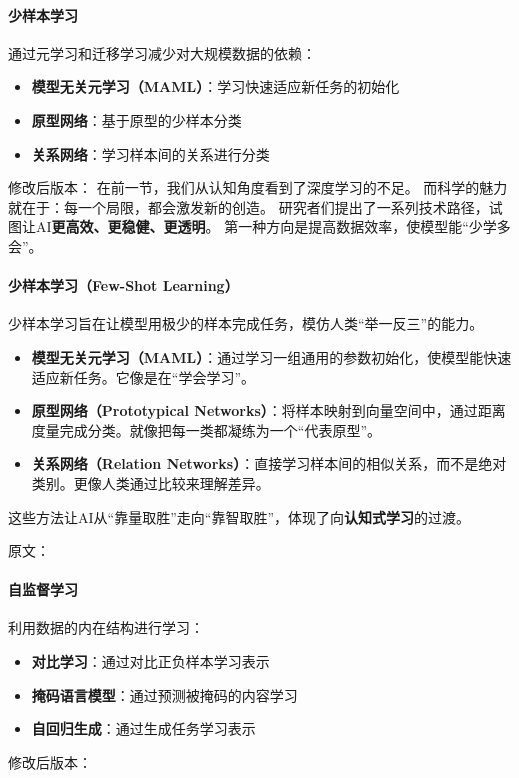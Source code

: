 \paragraph{少样本学习}
通过元学习和迁移学习减少对大规模数据的依赖：
\begin{itemize}
\item \textbf{模型无关元学习（MAML）}：学习快速适应新任务的初始化
\item \textbf{原型网络}：基于原型的少样本分类
\item \textbf{关系网络}：学习样本间的关系进行分类
\end{itemize}
修改后版本：
在前一节，我们从认知角度看到了深度学习的不足。  
而科学的魅力就在于：每一个局限，都会激发新的创造。  
研究者们提出了一系列技术路径，试图让AI\textbf{更高效、更稳健、更透明}。  
第一种方向是提高数据效率，使模型能“少学多会”。

\paragraph{少样本学习（Few-Shot Learning）}  
少样本学习旨在让模型用极少的样本完成任务，模仿人类“举一反三”的能力。  
\begin{itemize}
\item \textbf{模型无关元学习（MAML）}：通过学习一组通用的参数初始化，使模型能快速适应新任务。它像是在“学会学习”。  
\item \textbf{原型网络（Prototypical Networks）}：将样本映射到向量空间中，通过距离度量完成分类。就像把每一类都凝练为一个“代表原型”。  
\item \textbf{关系网络（Relation Networks）}：直接学习样本间的相似关系，而不是绝对类别。更像人类通过比较来理解差异。  
\end{itemize}
这些方法让AI从“靠量取胜”走向“靠智取胜”，体现了向\textbf{认知式学习}的过渡。



原文：
\paragraph{自监督学习}
利用数据的内在结构进行学习：
\begin{itemize}
\item \textbf{对比学习}：通过对比正负样本学习表示
\item \textbf{掩码语言模型}：通过预测被掩码的内容学习
\item \textbf{自回归生成}：通过生成任务学习表示
\end{itemize}
修改后版本：

